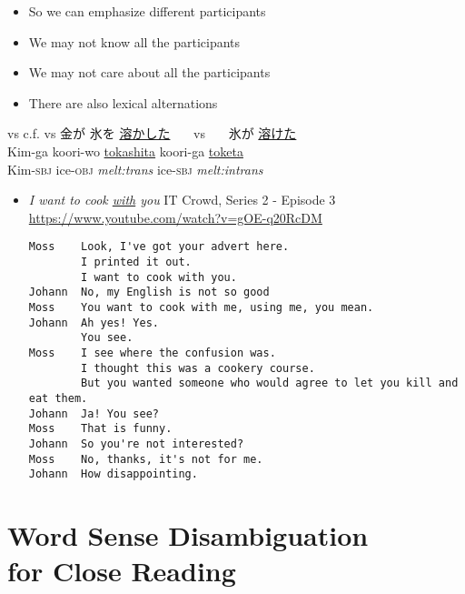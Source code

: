 \documentclass[a4paper,landscape,headrule,footrule,xetex]{foils}
\begin{document}
\begin{itemize}
\item So we can emphasize different participants
\item We may not know all the participants
\item We may not care about all the participants
\item There are also lexical alternations
\end{itemize}
\begin{exe}
\ex {} vs 
\ex c.f.  vs 
\ex \glll 金が 氷を \ul{溶かした}  {~~~vs~~~}  氷が \ul{溶けた} \\ 
Kim-ga koori-wo \ul{tokashita}  {} koori-ga \ul{toketa} \\
  Kim-\textsc{sbj} ice-\textsc{obj} \textit{melt:trans} 
{} ice-\textsc{sbj} \textit{melt:intrans} \\
\end{exe}



\begin{itemize}
\item \textit{I want to cook \ul{with} you}  IT Crowd, Series 2 - Episode 3
\\ \url{https://www.youtube.com/watch?v=gOE-q20RcDM}
\begin{verbatim}
Moss    Look, I've got your advert here.
        I printed it out.
        I want to cook with you.
Johann  No, my English is not so good 
Moss    You want to cook with me, using me, you mean.
Johann  Ah yes! Yes.
        You see.
Moss    I see where the confusion was.
        I thought this was a cookery course.
        But you wanted someone who would agree to let you kill and eat them.
Johann  Ja! You see? 
Moss    That is funny.
Johann  So you're not interested? 
Moss    No, thanks, it's not for me.
Johann  How disappointing.
\end{verbatim}
\end{itemize}





\section{Word Sense Disambiguation \\ for Close Reading}
\end{document}
